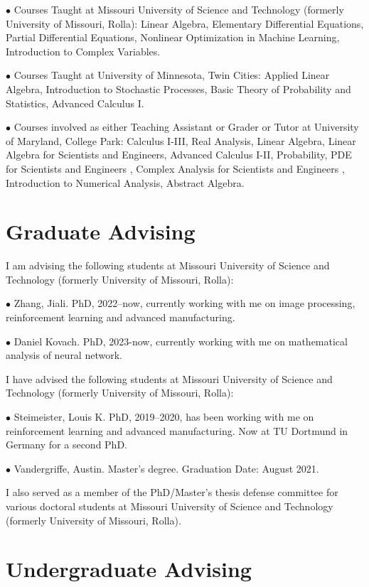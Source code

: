 \documentclass[margin,line]{res}
\begin{document}
\begin{resume}
$\bullet$ Courses Taught at Missouri University of Science and Technology (formerly University of Missouri, Rolla):
Linear Algebra, Elementary Differential Equations, Partial Differential Equations, Nonlinear Optimization in Machine Learning, Introduction to Complex Variables. 


$\bullet$ Courses Taught at University of Minnesota, Twin Cities: Applied Linear Algebra, Introduction to Stochastic
Processes, Basic Theory of Probability and
Statistics, Advanced Calculus I.


$\bullet$ Courses involved as either Teaching Assistant or Grader or Tutor at University of Maryland, College Park: 
Calculus I-III, Real Analysis, Linear Algebra, Linear
Algebra for Scientists and Engineers, Advanced Calculus I-II,
Probability, PDE for Scientists and Engineers , Complex Analysis for Scientists and Engineers , Introduction to Numerical Analysis, Abstract Algebra.


\section{\sc Graduate Advising}

I am advising the following students at Missouri University of Science and Technology (formerly University of Missouri, Rolla):

$\bullet$ Zhang, Jiali. PhD, 2022--now, currently working with me on image processing, reinforcement learning and advanced manufacturing.

$\bullet$ Daniel Kovach. PhD, 2023-now, currently working with me on mathematical analysis of neural network.

I have advised the following students at Missouri University of Science and Technology (formerly University of Missouri, Rolla):

$\bullet$ Steimeister, Louis K. PhD, 2019--2020, has been working with me on reinforcement learning and advanced manufacturing. Now at TU Dortmund in Germany for a second PhD.

$\bullet$ Vandergriffe, Austin. Master's degree. Graduation Date: August 2021.

I also served as a member of the PhD/Master's thesis defense committee for various doctoral students at Missouri University of Science and Technology (formerly University of Missouri, Rolla).


\section{\sc Undergraduate Advising}


\end{resume}
\end{document}
